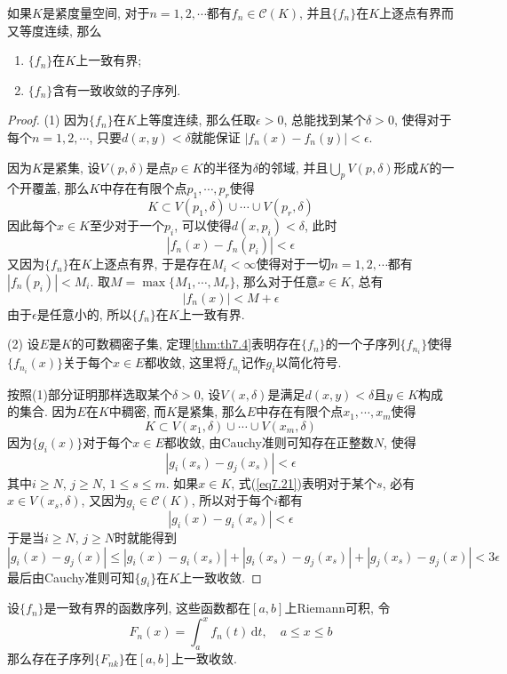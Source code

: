 \documentclass[cn,12pt,math=mtpro2,citestyle=gb7714-2015,bibstyle=gb7714-2015,twocol]{elegantbook}
\newcommand{\dt}{\,\text{d}t}
\begin{document}
\begin{theorem}\label{thm:th7.12}
  如果$K$是紧度量空间, 对于$n=1,2,\cdots$都有$f_n\in\mathscr{C}(K)$, 并且$\{f_n\}$在$K$上逐点有界而又等度连续, 那么
  \begin{enumerate}[label=(\arabic*)]
  \item $\{f_n\}$在$K$上一致有界;

  \item $\{f_n\}$含有一致收敛的子序列.
  \end{enumerate}
\end{theorem}
\begin{proof}
  (1) 因为$\{f_n\}$在$K$上等度连续, 那么任取$\epsilon>0$, 总能找到某个$\delta>0$, 使得对于每个$n=1,2,\cdots$, 只要$d(x,y)<\delta$就能保证
  $|f_n(x)-f_n(y)|<\epsilon$.

  因为$K$是紧集, 设$V(p,\delta)$是点$p\in K$的半径为$\delta$的邻域, 并且$\bigcup_p V(p,\delta)$形成$K$的一个开覆盖, 那么$K$中存在有限个点$p_1,\cdots,p_r$使得
  $$K\subset V(p_1,\delta)\cup\cdots\cup V(p_r,\delta)$$
  因此每个$x\in K$至少对于一个$p_i$, 可以使得$d(x,p_i)<\delta$, 此时
  $$|f_n(x)-f_n(p_i)|<\epsilon$$
  又因为$\{f_n\}$在$K$上逐点有界, 于是存在$M_i<\infty$使得对于一切$n=1,2,\cdots$都有$|f_n(p_i)|<M_i$. 取$M=\max\{M_1,\cdots,M_r\}$, 那么对于任意$x\in K$, 总有
  $$|f_n(x)|<M+\epsilon$$
  由于$\epsilon$是任意小的, 所以$\{f_n\}$在$K$上一致有界.

  (2) 设$E$是$K$的可数稠密子集, 定理\ref{thm:th7.4}表明存在$\{f_n\}$的一个子序列$\{f_{n_i}\}$使得$\{f_{n_i}(x)\}$关于每个$x\in E$都收敛, 这里将$f_{n_i}$记作$g_i$以简化符号.

  按照(1)部分证明那样选取某个$\delta>0$, 设$V(x,\delta)$是满足$d(x,y)<\delta$且$y\in K$构成的集合. 因为$E$在$K$中稠密, 而$K$是紧集, 那么$E$中存在有限个点$x_1,\cdots,x_m$使得
  \begin{equation}\label{eq7.21}
    K\subset V(x_1,\delta)\cup\cdots\cup V(x_m,\delta)
  \end{equation}
  因为$\{g_i(x)\}$对于每个$x\in E$都收敛, 由Cauchy准则可知存在正整数$N$, 使得
  $$|g_i(x_s)-g_j(x_s)|<\epsilon$$
  其中$i\geq N$, $j\geq N$, $1\leq s \leq m$. 如果$x\in K$, 式(\ref{eq7.21})表明对于某个$s$, 必有$x\in V(x_s,\delta)$, 又因为$g_i\in\mathscr{C}(K)$, 所以对于每个$i$都有
  $$|g_i(x)-g_i(x_s)|<\epsilon$$
  于是当$i\geq N$, $j\geq N$时就能得到
  $$|g_i(x)-g_j(x)|\leq|g_i(x)-g_i(x_s)|+|g_i(x_s)-g_j(x_s)|+|g_j(x_s)-g_j(x)|<3\epsilon$$
  最后由Cauchy准则可知$\{g_i\}$在$K$上一致收敛.

\end{proof}
\begin{example}
设$\{f_n\}$是一致有界的函数序列, 这些函数都在$[a,b]$上Riemann可积, 令
$$F_n(x)=\int_{a}^{x}f_n(t)\dt, \quad a\leq x\leq b$$
那么存在子序列$\{F_{nk}\}$在$[a,b]$上一致收敛.
\end{example}
\end{document}
